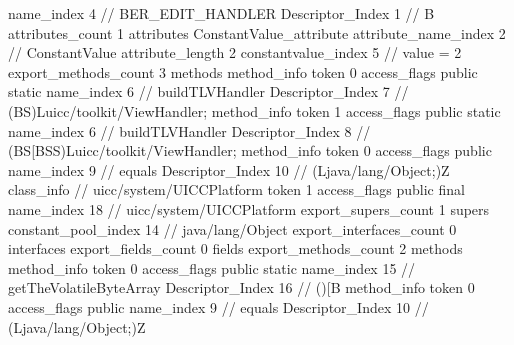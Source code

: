 {{{{{				name_index	4		// BER_EDIT_HANDLER
				Descriptor_Index	1		// B
				attributes_count	1
				attributes {
				ConstantValue_attribute {
					attribute_name_index	2		// ConstantValue
					attribute_length	2
					constantvalue_index	5		// value = 2
				}
				}
			}
			}
			export_methods_count	3
			methods {
				method_info {
					token	0
					access_flags	public static
					name_index	6		// buildTLVHandler
					Descriptor_Index	7		// (BS)Luicc/toolkit/ViewHandler;
				}
				method_info {
					token	1
					access_flags	public static
					name_index	6		// buildTLVHandler
					Descriptor_Index	8		// (BS[BSS)Luicc/toolkit/ViewHandler;
				}
				method_info {
					token	0
					access_flags	public
					name_index	9		// equals
					Descriptor_Index	10		// (Ljava/lang/Object;)Z
				}
			}
		}
		class_info {		// uicc/system/UICCPlatform
			token	1
			access_flags	public final
			name_index	18		// uicc/system/UICCPlatform
			export_supers_count	1
			supers {
				constant_pool_index	14		// java/lang/Object
			}
			export_interfaces_count	0
			interfaces {
			}
			export_fields_count	0
			fields {
			}
			export_methods_count	2
			methods {
				method_info {
					token	0
					access_flags	public static
					name_index	15		// getTheVolatileByteArray
					Descriptor_Index	16		// ()[B
				}
				method_info {
					token	0
					access_flags	public
					name_index	9		// equals
					Descriptor_Index	10		// (Ljava/lang/Object;)Z
				}
			}
		}
	}
}
